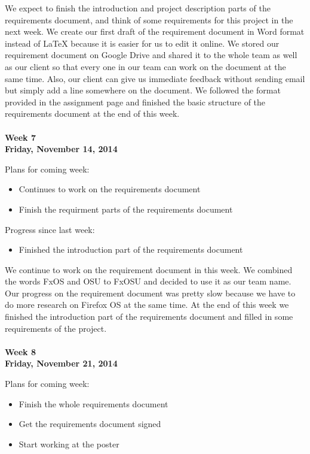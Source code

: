 \noindent We expect to finish the introduction and project description parts of the requirements document, and think of some requirements for this project in the next week. We create our first draft of the requirement document in Word format instead of LaTeX because it is easier for us to edit it online. We stored our requirement document on Google Drive and shared it to the whole team as well as our client so that every one in our team can work on the document at the same time. Also, our client can give us immediate feedback without sending email but simply add a line somewhere on the document. We followed the format provided in the assignment page and finished the basic structure of the requirements document at the end of this week. \\
\\
\textbf{Week 7\\Friday, November 14, 2014\\}

\noindent Plans for coming week:
\begin{itemize}
\item Continues to work on the requirements document
\item Finish the requirment parts of the requirements document
\end{itemize}

\noindent Progress since last week:
\begin{itemize}
\item Finished the introduction part of the requirements document
\end{itemize}

\noindent We continue to work on the requirement document in this week. We combined the words FxOS and OSU to FxOSU and decided to use it as our team name. Our progress on the requirement document was pretty slow because we have to do more research on Firefox OS at the same time. At the end of this week we finished the introduction part of the requirements document and filled in some requirements of the project. \\
\\
\textbf{Week 8\\Friday, November 21, 2014\\}

\noindent Plans for coming week:
\begin{itemize}
\item Finish the whole requirements document
\item Get the requirements document signed
\item Start working at the poster
\end{itemize}

